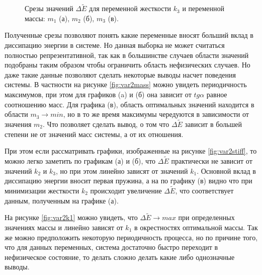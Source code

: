 \begin{figure}[b!]
    \begin{minipage}[h]{0.3\linewidth}
    \end{minipage}
    \hfill
    \begin{minipage}[h]{0.3\linewidth}
    \end{minipage}
    \begin{minipage}[h]{0.3\linewidth}
    \end{minipage}
    \caption{Срезы значений $\Delta \tilde{E}$ для переменной жесткости $k_3$ и переменной массы: $m_1$ (а), $m_2$ (б), $m_3$ (в). }
    \label{fig:var2k3}
\end{figure}


Полученные срезы позволяют понять какие переменные вносят больший вклад в диссипацию энергии в системе. Но данная выборка не может считаться полностью репрезентативной, так как в большинстве случаев области значений подобраны таким образом чтобы ограничить область нефизических случаев. Но даже такие данные позволяют сделать некоторые выводы насчет поведения системы. В частности на рисунке \ref{fig:var2mass} можно увидеть периодичность максимумов, при этом для графиков (a) и (б) она зависит от $tg \alpha$ равное соотношению масс. Для графика (в), область оптимальных значений находится в области $m_3 \rightarrow min$, но в то же время максимумы чередуются в зависимости от значения $m_2$. Что позволяет сделать вывод, о том что $\Delta \tilde{E}$ зависит в большей степени не от значений масс системы, а от их отношения.

При этом если рассматривать графики, изображенные на рисунке \ref{fig:var2stiff}, то можно легко заметить по графикам (а) и (б), что
$\Delta \tilde{E}$ практически не зависит от значений $k_2$ и $k_3$, но при этом линейно зависят от значений $k_1$. Основной вклад в диссипацию энергии вносит первая пружина, а на по графику (в) видно что при минимизации жесткости $k_2$ происходит увеличение $\Delta \tilde{E}$, что соответствует данным, полученным на графике (а).

На рисунке \ref{fig:var2k1} можно увидеть, что $\Delta \tilde{E} \rightarrow max$ при определенных значениях массы и линейно зависят от $k_1$ в окрестностях оптимальной массы. Так же можно предположить некоторую периодичность процесса, но по причине того, что для данных переменных, система достаточно быстро переходит в нефизическое состояние, то делать сложно делать какие либо однозначные выводы.


